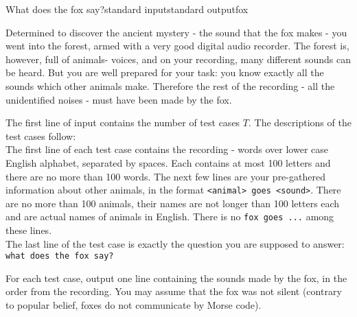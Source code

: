 \begin{problem}{What does the fox say?}{standard input}{standard output}{fox}

Determined to discover the ancient mystery - the sound that the fox makes - you went into the
forest, armed with a very good digital audio recorder. The forest is, however, full of animals-
voices, and on your recording, many different sounds can be heard. But you are well prepared for
your task: you know exactly all the sounds which other animals make. Therefore the rest of the
recording - all the unidentified noises - must have been made by the fox.

\InputFile

The first line of input contains the number of test cases $T$. The descriptions of the test cases
follow:\\
The first line of each test case contains the recording - words over lower case English alphabet,
separated by spaces. Each contains at most 100 letters and there are no more than 100 words.
The next few lines are your pre-gathered information about other animals, in the format
\texttt{<animal> goes <sound>}.
There are no more than 100 animals, their names are not longer than 100 letters each and are actual
names of animals in English. There is no \texttt{fox goes ...} among these lines.\\

The last line of the test case is exactly the question you are supposed to answer:
\texttt{what does the fox say?}

\OutputFile

For each test case, output one line containing the sounds made by the fox, in the order from the
recording.
You may assume that the fox was not silent (contrary to popular belief, foxes do not communicate by
Morse code).

\Example

\begin{example}
%
\end{example}

\end{problem}
